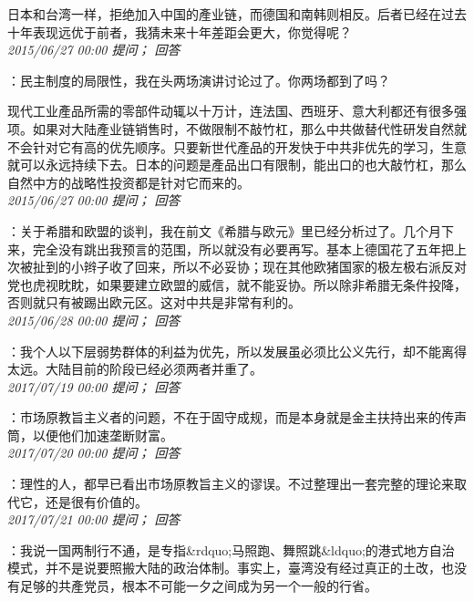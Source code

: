 \documentclass[twocolumn]{ctexart}
\begin{document}
日本和台湾一样，拒绝加入中国的產业链，而德国和南韩则相反。后者已经在过去十年表现远优于前者，我猜未来十年差距会更大，你觉得呢？\\

\textit{\hfill\noindent\small 2015/06/27 00:00 提问； 回答}

：民主制度的局限性，我在头两场演讲讨论过了。你两场都到了吗？

现代工业產品所需的零部件动辄以十万计，连法国、西班牙、意大利都还有很多强项。如果对大陆產业链销售时，不做限制不敲竹杠，那么中共做替代性研发自然就不会针对它有高的优先顺序。只要新世代產品的开发快于中共非优先的学习，生意就可以永远持续下去。日本的问题是產品出口有限制，能出口的也大敲竹杠，那么自然中方的战略性投资都是针对它而来的。\\

\textit{\hfill\noindent\small 2015/06/27 00:00 提问； 回答}

：关于希腊和欧盟的谈判，我在前文《希腊与欧元》里已经分析过了。几个月下来，完全没有跳出我预言的范围，所以就没有必要再写。基本上德国花了五年把上次被扯到的小辫子收了回来，所以不必妥协；现在其他欧猪国家的极左极右派反对党也虎视眈眈，如果要建立欧盟的威信，就不能妥协。所以除非希腊无条件投降，否则就只有被踢出欧元区。这对中共是非常有利的。\\

\textit{\hfill\noindent\small 2015/06/28 00:00 提问； 回答}

：我个人以下层弱势群体的利益为优先，所以发展虽必须比公义先行，却不能离得太远。大陆目前的阶段已经必须两者并重了。\\

\textit{\hfill\noindent\small 2017/07/19 00:00 提问； 回答}

：市场原教旨主义者的问题，不在于固守成规，而是本身就是金主扶持出来的传声筒，以便他们加速垄断财富。\\

\textit{\hfill\noindent\small 2017/07/20 00:00 提问； 回答}

：理性的人，都早已看出市场原教旨主义的谬误。不过整理出一套完整的理论来取代它，还是很有价值的。\\

\textit{\hfill\noindent\small 2017/07/21 00:00 提问； 回答}

：我说一国两制行不通，是专指\&rdquo;马照跑、舞照跳\&ldquo;的港式地方自治模式，并不是说要照搬大陆的政治体制。事实上，臺湾没有经过真正的土改，也没有足够的共產党员，根本不可能一夕之间成为另一个一般的行省。
\end{document}
